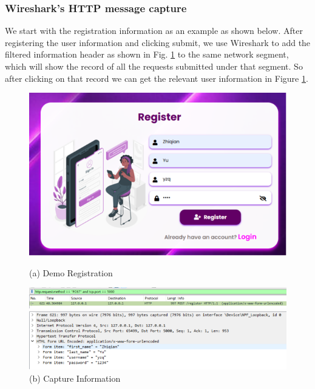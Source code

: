 \documentclass{article}
\begin{document}
\subsubsection{Wireshark's HTTP message capture}
We start with the registration information as an example as shown below. After registering the user information and clicking submit, we use Wireshark to add the filtered information header as shown in Fig. \ref{fig:Demo Registration} to the same network segment, which will show the record of all the requests submitted under that segment. 
So after clicking on that record we can get the relevant user information in Figure \ref{fig:Demo Registration}.
\begin{figure}[H]
    \centering
    \begin{minipage}{0.5\textwidth}
        \centering
        \includegraphics[width=\textwidth]{images/Demo_Registration.png}
        \label{fig:Demo Registration}
        \caption*{(a) Demo Registration}
    \end{minipage}
    \hfill
    \begin{minipage}{0.5\textwidth}
        \centering
        \includegraphics[width=\textwidth]{images/Capture_Information.png}
        \caption*{(b) Capture Information}
    \end{minipage}
    \hfill
    \begin{minipage}{0.5\textwidth}
        \centering
        \includegraphics[width=\textwidth]{images/Information_content.png}

\end{minipage}
\end{figure}
\end{document}

